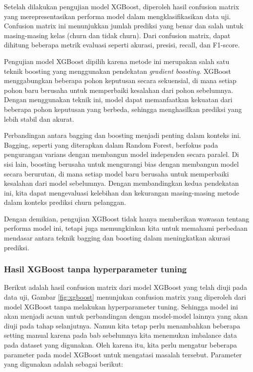 Setelah dilakukan pengujian model XGBoost, diperoleh hasil confusion matrix yang merepresentasikan performa model dalam mengklasifikasikan data uji. Confusion matrix ini menunjukkan jumlah prediksi yang benar dan salah untuk masing-masing kelas (churn dan tidak churn). Dari confusion matrix, dapat dihitung beberapa metrik evaluasi seperti akurasi, presisi, recall, dan F1-score.

Pengujian model XGBoost dipilih karena metode ini merupakan salah satu teknik boosting yang menggunakan pendekatan \textit{gradient boosting}. XGBoost menggabungkan beberapa pohon keputusan secara sekuensial, di mana setiap pohon baru berusaha untuk memperbaiki kesalahan dari pohon sebelumnya. Dengan menggunakan teknik ini, model dapat memanfaatkan kekuatan dari beberapa pohon keputusan yang berbeda, sehingga menghasilkan prediksi yang lebih stabil dan akurat.

Perbandingan antara bagging dan boosting menjadi penting dalam konteks ini. Bagging, seperti yang diterapkan dalam Random Forest, berfokus pada pengurangan varians dengan membangun model independen secara paralel. Di sisi lain, boosting berusaha untuk mengurangi bias dengan membangun model secara berurutan, di mana setiap model baru berusaha untuk memperbaiki kesalahan dari model sebelumnya. Dengan membandingkan kedua pendekatan ini, kita dapat mengevaluasi kelebihan dan kekurangan masing-masing metode dalam konteks prediksi churn pelanggan.

Dengan demikian, pengujian XGBoost tidak hanya memberikan wawasan tentang performa model ini, tetapi juga memungkinkan kita untuk memahami perbedaan mendasar antara teknik bagging dan boosting dalam meningkatkan akurasi prediksi.

\subsubsection{Hasil XGBoost tanpa hyperparameter tuning}
Berikut adalah hasil confusion matrix dari model XGBoost yang telah diuji pada data uji, Gambar \ref{fig:xgboost} menunjukan confusion matrix yang diperoleh dari model XGBoost tanpa melakukan hyperparameter tuning. Sehingga model ini akan menjadi acuan untuk perbandingan dengan model-model lainnya yang akan diuji pada tahap selanjutnya. Namun kita tetap perlu menambahkan beberapa setting manual karena pada bab sebelumnya kita menemukan imbalance data pada dataset yang digunakan. Oleh karena itu, kita perlu mengatur beberapa parameter pada model XGBoost untuk mengatasi masalah tersebut. Parameter yang digunakan adalah sebagai berikut:

